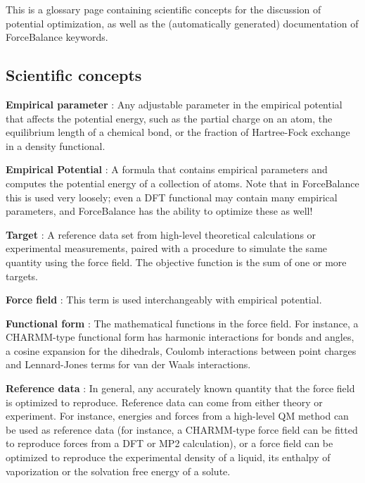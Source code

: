 \-This is a glossary page containing scientific concepts for the discussion of potential optimization, as well as the (automatically generated) documentation of \-Force\-Balance keywords.\hypertarget{glossary_concepts}{}\subsection{\-Scientific concepts}\label{glossary_concepts}
\begin{DoxyItemize}
\item {\bfseries  \-Empirical parameter } \-: \-Any adjustable parameter in the empirical potential that affects the potential energy, such as the partial charge on an atom, the equilibrium length of a chemical bond, or the fraction of \-Hartree-\/\-Fock exchange in a density functional.\end{DoxyItemize}
\begin{DoxyItemize}
\item {\bfseries  \-Empirical \-Potential } \-: \-A formula that contains empirical parameters and computes the potential energy of a collection of atoms. \-Note that in \-Force\-Balance this is used very loosely; even a \-D\-F\-T functional may contain many empirical parameters, and \-Force\-Balance has the ability to optimize these as well!\end{DoxyItemize}
\begin{DoxyItemize}
\item {\bfseries  \-Target } \-: \-A reference data set from high-\/level theoretical calculations or experimental measurements, paired with a procedure to simulate the same quantity using the force field. \-The objective function is the sum of one or more targets.\end{DoxyItemize}
\begin{DoxyItemize}
\item {\bfseries  \-Force field } \-: \-This term is used interchangeably with empirical potential.\end{DoxyItemize}
\begin{DoxyItemize}
\item {\bfseries  \-Functional form } \-: \-The mathematical functions in the force field. \-For instance, a \-C\-H\-A\-R\-M\-M-\/type functional form has harmonic interactions for bonds and angles, a cosine expansion for the dihedrals, \-Coulomb interactions between point charges and \-Lennard-\/\-Jones terms for van der \-Waals interactions.\end{DoxyItemize}
\begin{DoxyItemize}
\item {\bfseries  \-Reference data } \-: \-In general, any accurately known quantity that the force field is optimized to reproduce. \-Reference data can come from either theory or experiment. \-For instance, energies and forces from a high-\/level \-Q\-M method can be used as reference data (for instance, a \-C\-H\-A\-R\-M\-M-\/type force field can be fitted to reproduce forces from a \-D\-F\-T or \-M\-P2 calculation), or a force field can be optimized to reproduce the experimental density of a liquid, its enthalpy of vaporization or the solvation free energy of a solute.\end{DoxyItemize}
